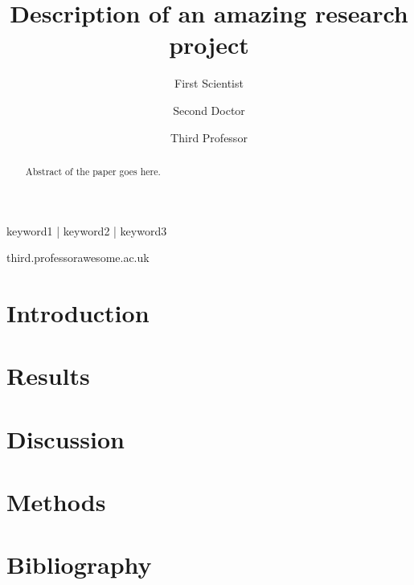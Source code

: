 
\title{Description of an amazing research project}

\author[1]{First Scientist }
\author[2]{Second Doctor }
\author[1,\Letter]{Third Professor }
\date{}

\maketitle

\begin{abstract}
Abstract of the paper goes here.
\lipsum[1]
\end{abstract}

\begin{keywords}
keyword1 | keyword2 | keyword3
\end{keywords}

\begin{corrauthor}
third.professor\at awesome.ac.uk
\end{corrauthor}

\section*{Introduction}\label{s:introduction}


\section*{Results}\label{s:results}


\section*{Discussion}\label{s:discussion}

\section*{Methods}\label{s:methods}


\section*{Bibliography}

